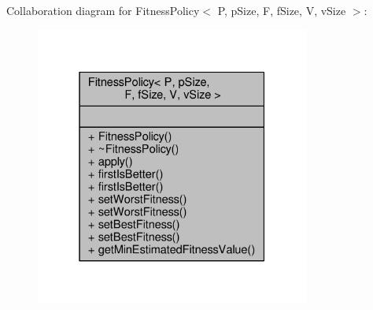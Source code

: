 Collaboration diagram for Fitness\+Policy$<$ P, p\+Size, F, f\+Size, V, v\+Size $>$\+:\nopagebreak
\begin{figure}[H]
\begin{center}
\leavevmode
\includegraphics[width=256pt]{classFitnessPolicy__coll__graph}
\end{center}
\end{figure}
